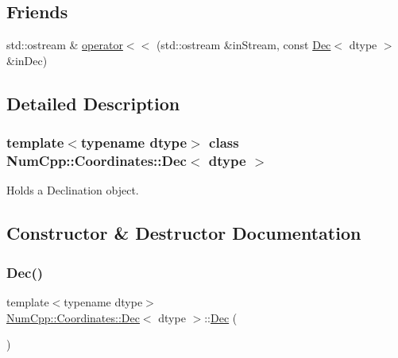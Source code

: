 \subsection*{Friends}
\begin{DoxyCompactItemize}
\item 
std\+::ostream \& \mbox{\hyperlink{class_num_cpp_1_1_coordinates_1_1_dec_aa501ef35ac052d5084d792bfcde2345f}{operator$<$$<$}} (std\+::ostream \&in\+Stream, const \mbox{\hyperlink{class_num_cpp_1_1_coordinates_1_1_dec}{Dec}}$<$ dtype $>$ \&in\+Dec)
\end{DoxyCompactItemize}


\subsection{Detailed Description}
\subsubsection*{template$<$typename dtype$>$\newline
class Num\+Cpp\+::\+Coordinates\+::\+Dec$<$ dtype $>$}

Holds a Declination object. 

\subsection{Constructor \& Destructor Documentation}
\mbox{\label{class_num_cpp_1_1_coordinates_1_1_dec_aa32c17eaf9b36b0c1dd2ac1567a823b1}} 
\subsubsection{\texorpdfstring{Dec()}{Dec()}\hspace{0.1cm}{\footnotesize\ttfamily [1/3]}}
{\footnotesize\ttfamily template$<$typename dtype$>$ \\
\mbox{\hyperlink{class_num_cpp_1_1_coordinates_1_1_dec}{Num\+Cpp\+::\+Coordinates\+::\+Dec}}$<$ dtype $>$\+::\mbox{\hyperlink{class_num_cpp_1_1_coordinates_1_1_dec}{Dec}} (\begin{DoxyParamCaption}{ }\end{DoxyParamCaption})\hspace{0.3cm}{\ttfamily [inline]}}

